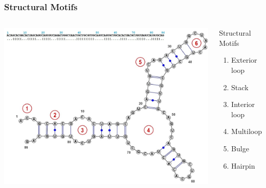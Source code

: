 \documentclass{beamer}
\begin{document}
\begin{frame}
  \frametitle{Structural Motifs}
  \begin{columns}
  \includegraphics[width=.9\linewidth]{rnass}

  \begin{block}{Structural Motifs}
  \begin{enumerate}
  \item Exterior loop
  \item Stack
  \item Interior loop
  \item Multiloop
  \item Bulge
  \item Hairpin
  \end{enumerate}
  \end{block}
\end{columns}
\end{frame}
\end{document}
